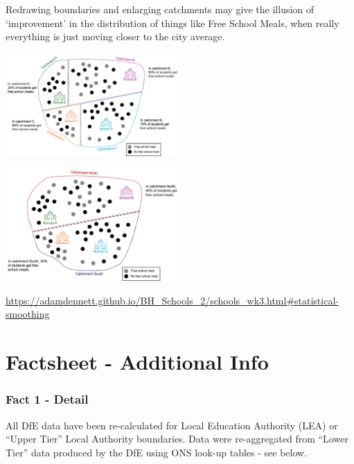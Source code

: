 \documentclass[
  letterpaper,
  DIV=11,
  numbers=noendperiod]{scrartcl}
\begin{document}
Redrawing boundaries and enlarging catchments may give the illusion of
`improvement' in the distribution of things like Free School Meals, when
really everything is just moving closer to the city average.

\includegraphics[width=0.5\textwidth,height=\textheight]{images/stat_smoothing_1.png}

\includegraphics[width=0.5\textwidth,height=\textheight]{images/stat_smoothing_2.png}

\url{https://adamdennett.github.io/BH_Schools_2/schools_wk3.html\#statistical-smoothing}

\hypertarget{factsheet---additional-info}{%
\section{Factsheet - Additional
Info}\label{factsheet---additional-info}}

\hypertarget{fact-1---detail}{%
\subsubsection{Fact 1 - Detail}\label{fact-1---detail}}

All DfE data have been re-calculated for Local Education Authority (LEA)
or ``Upper Tier'' Local Authority boundaries. Data were re-aggregated
from ``Lower Tier'' data produced by the DfE using ONS look-up tables -
see below.
\end{document}
